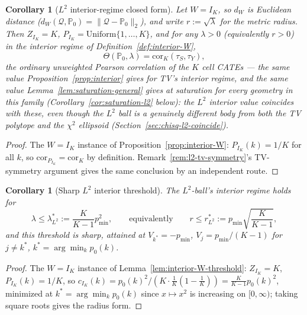 \documentclass[11pt]{article}
\theoremstyle{plain}
\newtheorem{corollary}[theorem]{Corollary}
\theoremstyle{definition}
\theoremstyle{remark}
\newcommand{\PP}{\mathbb{P}}
\newcommand{\Q}{\mathcal{Q}}
\newcommand{\Corr}{\mathrm{cor}}
\begin{document}
\begin{corollary}[$L^2$ interior-regime closed form]\label{cor:interior-l2}
Let $W=I_K$, so $d_W$ is Euclidean distance ($d_W(\Q,\PP_0)=\|\Q-\PP_0\|_2$), and write
$r:=\sqrt\lambda$ for the metric radius. Then $Z_{I_K}=K$, $P_{I_K}=\mathrm{Uniform}\{1,\dots,K\}$,
and for any $\lambda>0$ (equivalently $r>0$) in the interior regime of
Definition~\ref{def:interior-W},
\begin{equation}\label{eq:interior-l2}
    \Theta(\PP_0,\lambda) = \Corr_K(\tau_S,\tau_Y),
\end{equation}
the ordinary \emph{unweighted} Pearson correlation of the $K$ cell CATEs --- the same
value Proposition~\ref{prop:interior} gives for TV's interior regime, and the same
value Lemma~\ref{lem:saturation-general} gives at saturation for \emph{every} geometry
in this family (Corollary~\ref{cor:saturation-l2} below): the $L^2$ interior value
coincides with these, even though the $L^2$ ball is a genuinely different body from
both the TV polytope and the $\chi^2$ ellipsoid (Section~\ref{sec:chisq-l2-coincide}).
\end{corollary}

\begin{proof}
The $W=I_K$ instance of Proposition~\ref{prop:interior-W}: $P_{I_K}(k)=1/K$ for all
$k$, so $\Corr_{P_{I_K}}=\Corr_K$ by definition. Remark~\ref{rem:l2-tv-symmetry}'s
TV-symmetry argument gives the same conclusion by an independent route.
\end{proof}

\begin{corollary}[Sharp $L^2$ interior threshold]\label{cor:interior-l2-threshold}
The $L^2$-ball's interior regime holds for
\begin{equation}\label{eq:threshold-l2}
    \lambda\le\lambda^*_{L^2}:=\frac K{K-1}p_{\min}^2,
    \qquad\text{equivalently}\qquad
    r\le r^*_{L^2}:=p_{\min}\sqrt{\frac K{K-1}},
\end{equation}
and this threshold is sharp, attained at $V_{k^*}=-p_{\min}$, $V_j=p_{\min}/(K-1)$ for
$j\ne k^*$, $k^*=\arg\min_kp_0(k)$.
\end{corollary}

\begin{proof}
The $W=I_K$ instance of Lemma~\ref{lem:interior-W-threshold}: $Z_{I_K}=K$,
$P_{I_K}(k)=1/K$, so $c_{I_K}(k)=p_0(k)^2/(K\cdot\frac1K(1-\frac1K))
=\frac K{K-1}p_0(k)^2$, minimized at $k^*=\arg\min_kp_0(k)$ since $x\mapsto x^2$ is
increasing on $[0,\infty)$; taking square roots gives the radius form.
\end{proof}
\end{document}
